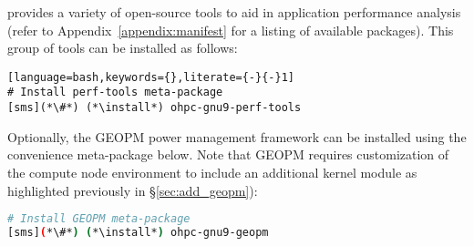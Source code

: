 \OHPC{} provides a variety of open-source tools to aid in application
performance analysis (refer to Appendix~\ref{appendix:manifest} for a listing
of available packages). This group of tools can be installed as follows:

\begin{lstlisting}[language=bash,keywords={},literate={-}{-}1]
# Install perf-tools meta-package
[sms](*\#*) (*\install*) ohpc-gnu9-perf-tools
\end{lstlisting}

\noindent Optionally, the GEOPM power management framework can be installed
using the convenience meta-package below. Note that GEOPM
requires customization of the compute node environment to include an additional
kernel module as highlighted previously in \S\ref{sec:add_geopm}):

\begin{lstlisting}[language=bash,keywords={},upquote=true]
# Install GEOPM meta-package
[sms](*\#*) (*\install*) ohpc-gnu9-geopm

\end{lstlisting}
